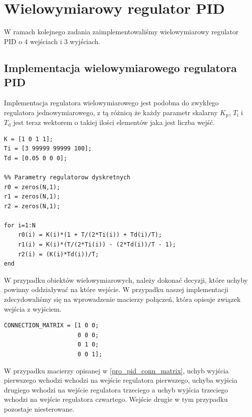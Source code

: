 \chapter{Wielowymiarowy regulator PID}
\label{pro_pid}

W ramach kolejnego zadania zaimplementowaliśmy wielowymiarowy regulator 
PID o 4 wejściach i 3 wyjściach. 

\section{Implementacja wielowymiarowego regulatora PID}
\label{pro_pid_implementacja}

Implementacja regulatora wielowymiarowego
jest podobna do zwykłego regulatora jednowymiarowego, z tą różnicą
że każdy parametr skalarny $K_{\mathrm{p}}$, $T_{\mathrm{i}}$ i $T_{\mathrm{d}}$
jest teraz wektorem o takiej ilości elementów jaka jest liczba wejść. \\

\begin{lstlisting}[style=custommatlab,frame=single,label={pro_pid_parametry},caption={Przykładowa definicja parametrów regulatora},captionpos=b]
%% Parametry regulatorow ciaglych
K = [1 0 1 1];
Ti = [3 99999 99999 100];
Td = [0.05 0 0 0];

%% Parametry regulatorow dyskretnych
r0 = zeros(N,1);
r1 = zeros(N,1);
r2 = zeros(N,1);

for i=1:N
    r0(i) = K(i)*(1 + T/(2*Ti(i)) + Td(i)/T);
    r1(i) = K(i)*(T/(2*Ti(i)) - (2*Td(i))/T - 1);
    r2(i) = (K(i)*Td(i))/T;
end
\end{lstlisting}

W przypadku obiektów wielowymiarowych, należy dokonać decyzji, które uchyby 
powinny oddziaływać na które wejście. W przypadku naszej implementacji zdecydowaliśmy 
się na wprowadzenie macierzy połączeń, która opisuje związek wejścia z wyjściem. \\

\begin{lstlisting}[style=custommatlab,frame=single,label={pro_pid_conn_matrix},caption={Przykładowa macierz połączeń},captionpos=b]
% macierz polaczen, okresla z jaka waga jest brany dany uchyb do regulatora
CONNECTION_MATRIX = [1 0 0;
                     0 0 0;
                     0 1 0;
                     0 0 1];
\end{lstlisting}

W przypadku macierzy opisanej w \ref{pro_pid_conn_matrix}, uchyb wyjścia pierwszego
wchodzi wchodzi na wejście regulatora pierwszego, uchyba wyjścia drugiego wchodzi
na wejście regulatora trzeciego a uchyb wyjścia trzeciego wchodzi na wejście regulatora 
czwartego. Wejście drugie w tym przypadku pozostaje niesterowane.\\

